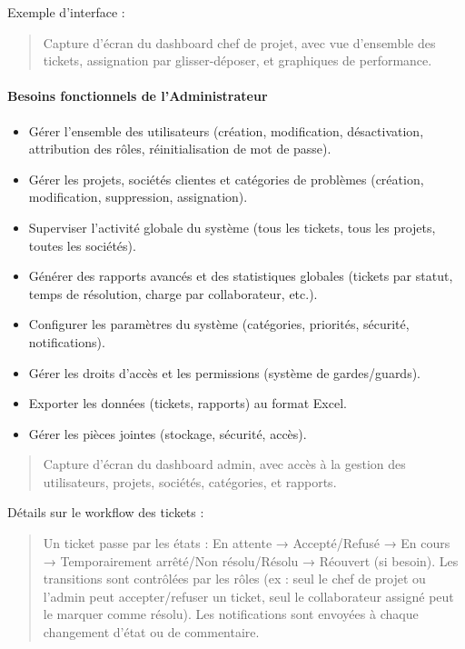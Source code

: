 Exemple d'interface :
\begin{quote}
    Capture d'écran du dashboard chef de projet, avec vue d'ensemble des tickets, assignation par glisser-déposer, et graphiques de performance.
\end{quote}

\paragraph{Besoins fonctionnels de l'Administrateur}
\label{sec:besoins-fonctionnels-administrateur}
\begin{itemize}
    \item Gérer l'ensemble des utilisateurs (création, modification, désactivation, attribution des rôles, réinitialisation de mot de passe).
    \item Gérer les projets, sociétés clientes et catégories de problèmes (création, modification, suppression, assignation).
    \item Superviser l'activité globale du système (tous les tickets, tous les projets, toutes les sociétés).
    \item Générer des rapports avancés et des statistiques globales (tickets par statut, temps de résolution, charge par collaborateur, etc.).
    \item Configurer les paramètres du système (catégories, priorités, sécurité, notifications).
    \item Gérer les droits d'accès et les permissions (système de gardes/guards).
    \item Exporter les données (tickets, rapports) au format Excel.
    \item Gérer les pièces jointes (stockage, sécurité, accès).
\end{itemize}

\begin{quote}
    Capture d'écran du dashboard admin, avec accès à la gestion des utilisateurs, projets, sociétés, catégories, et rapports.
\end{quote}

Détails sur le workflow des tickets :
\begin{quote}
    Un ticket passe par les états : En attente → Accepté/Refusé → En cours → Temporairement arrêté/Non résolu/Résolu → Réouvert (si besoin). Les transitions sont contrôlées par les rôles (ex : seul le chef de projet ou l'admin peut accepter/refuser un ticket, seul le collaborateur assigné peut le marquer comme résolu). Les notifications sont envoyées à chaque changement d'état ou de commentaire.
\end{quote}

